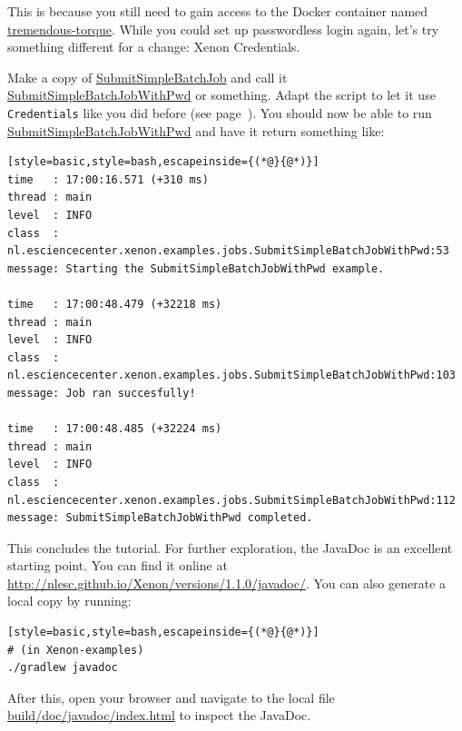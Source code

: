\documentclass[12pt, a4paper, twoside, openany, titlepage]{book}
\begin{document}
This is because you still need to gain access to the Docker container named \url{tremendous-torque}. While you could set up passwordless login again, let's try something different for a change: Xenon Credentials.

Make a copy of \url{SubmitSimpleBatchJob} and call it \url{SubmitSimpleBatchJobWithPwd} or something. Adapt the script to let it use \texttt{Credentials} like you did before (see page~\pageref{credentials-snippet}). You should now be able to run \url{SubmitSimpleBatchJobWithPwd} and have it return something like:

\begin{lstlisting}[style=basic,style=bash,escapeinside={(*@}{@*)}]
time   : 17:00:16.571 (+310 ms)
thread : main
level  : INFO
class  : nl.esciencecenter.xenon.examples.jobs.SubmitSimpleBatchJobWithPwd:53
message: Starting the SubmitSimpleBatchJobWithPwd example.

time   : 17:00:48.479 (+32218 ms)
thread : main
level  : INFO
class  : nl.esciencecenter.xenon.examples.jobs.SubmitSimpleBatchJobWithPwd:103
message: Job ran succesfully!

time   : 17:00:48.485 (+32224 ms)
thread : main
level  : INFO
class  : nl.esciencecenter.xenon.examples.jobs.SubmitSimpleBatchJobWithPwd:112
message: SubmitSimpleBatchJobWithPwd completed.
\end{lstlisting}

This concludes the tutorial. For further exploration, the JavaDoc is an excellent starting point. You can find it online at \url{http://nlesc.github.io/Xenon/versions/1.1.0/javadoc/}. You can also generate a local copy by running:
\begin{lstlisting}[style=basic,style=bash,escapeinside={(*@}{@*)}]
# (in Xenon-examples)
./gradlew javadoc
\end{lstlisting}
After this, open your browser and navigate to the local file \url{build/doc/javadoc/index.html} to inspect the JavaDoc.


\backmatter

\printindex
\end{document}
